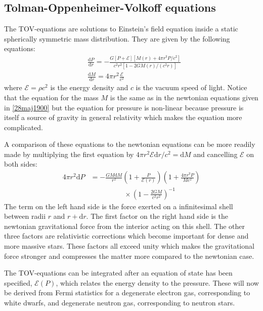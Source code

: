 \documentclass[twocolumn]{article}
\begin{document}
\begin{large}
\subsection*{Tolman-Oppenheimer-Volkoff equations}
The TOV-equations are solutions to Einstein's field equation inside a static spherically symmetric mass distribution. They are given by the following equations:
\begin{equation}
    \begin{split}
        &\frac{\text{d}P}{\text{d}r} = -\frac{G\left[P+\mathcal{E}\right]\left[M(r)+4\pi r^3P/c^2\right]}{c^2r^2[1-2GM(r)/(c^2r)]} \\ 
        &\frac{\text{d}M}{\text{d}r} = 4\pi r^2\frac{\mathcal{E}}{c^2}
    \end{split}
\end{equation}
where $\mathcal{E} = \rho c^2$ is the energy density and $c$ is the vacuum speed of light. Notice that the equation for the mass $M$ is the same as in the newtonian equations given in \eqref{28maj1900} but the equation for pressure is non-linear because pressure is itself a source of gravity in general relativity which makes the equation more complicated.

A comparison of these equations to the newtonian equations can be more readily made by multiplying the first equation by $4\pi r^2\mathcal{E}\text{d}r/c^2 = \text{d}M$ and cancelling $\mathcal{E}$ on both sides:
\begin{equation}
    \label{28maj1039}
    \begin{split}
        4\pi r^2\text{d}P &= -\frac{GM\text{d}M}{r^2}\left(1+\frac{P}{\mathcal{E}(r)}\right)\left(1+\frac{4\pi r^3P}{Mc^2}\right) \\ 
        &\hspace{2cm}\times\left(1-\frac{2GM}{c^2r^2}\right)^{-1}
    \end{split}
\end{equation}
The term on the left hand side is the force exerted on a infinitesimal shell between radii $r$ and $r+\text{d}r$. The first factor on the right hand side is the newtonian gravitational force from the interior acting on this shell. The other three factors are relativistic corrections which become important for dense and more massive stars. These factors all exceed unity which makes the gravitational force stronger and compresses the matter more compared to the newtonian case.

The TOV-equations can be integrated after an equation of state has been specified, $\mathcal{E}(P)$, which relates the energy density to the pressure. These will now be derived from Fermi statistics for a degenerate electron gas, corresponding to white dwarfs, and degenerate neutron gas, corresponding to neutron stars.


\end{large}
\end{document}
